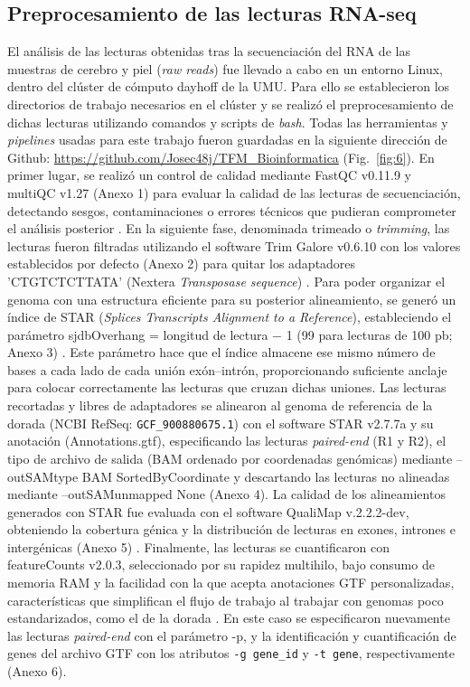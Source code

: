 \documentclass[10pt,a4paper]{article}
\begin{document}
\subsection{Preprocesamiento de las lecturas RNA-seq}  
El análisis de las lecturas obtenidas tras la secuenciación del RNA de las muestras de cerebro y piel (\textit{raw reads}) fue llevado a cabo en un entorno Linux, dentro del clúster de cómputo dayhoff de la UMU. Para ello se establecieron los directorios de trabajo necesarios en el clúster y se realizó el preprocesamiento de dichas lecturas utilizando comandos y scripts de \textit{bash}. Todas las herramientas y  \textit{pipelines} usadas para este trabajo fueron guardadas en la siguiente dirección de Github: \url{https://github.com/Josec48j/TFM_Bioinformatica} (Fig.~\ref{fig:6}). En primer lugar, se realizó un control de calidad mediante FastQC v0.11.9 y multiQC v1.27 (Anexo 1) para evaluar la calidad de las lecturas de secuenciación, detectando sesgos, contaminaciones o errores técnicos que pudieran comprometer el análisis posterior \parencite{Andrews2010}. En la siguiente fase, denominada trimeado o \textit{trimming}, las lecturas fueron filtradas utilizando el software Trim Galore v0.6.10 con los valores establecidos por defecto (Anexo 2) para quitar los adaptadores 'CTGTCTCTTATA' (Nextera \textit{Transposase sequence}) \parencite{Krueger2015}. Para poder organizar el genoma con una estructura eficiente para su posterior alineamiento, se generó un índice de STAR (\textit{Splices Transcripts Alignment to a Reference}), estableciendo el parámetro sjdbOverhang = longitud de lectura − 1 (99 para lecturas de 100 pb; Anexo 3) \parencite{Dobin2013}. Este parámetro hace que el índice almacene ese mismo número de bases a cada lado de cada unión exón–intrón, proporcionando suficiente anclaje para colocar correctamente las lecturas que cruzan dichas uniones. Las lecturas recortadas y libres de adaptadores se alinearon al genoma de referencia de la dorada (NCBI RefSeq: \texttt{GCF\_900880675.1}) con el software STAR v2.7.7a y su anotación (Annotations.gtf), especificando las lecturas \textit{paired-end} (R1 y R2), el tipo de archivo de salida (BAM ordenado por coordenadas genómicas) mediante --outSAMtype BAM SortedByCoordinate y descartando las lecturas no alineadas mediante --outSAMunmapped None (Anexo 4). La calidad de los alineamientos generados con STAR fue evaluada con el software QualiMap v.2.2.2-dev, obteniendo la cobertura génica y la distribución de lecturas en exones, intrones e intergénicas (Anexo 5)  \parencite{GarciaAlcalde2012}. Finalmente, las lecturas se cuantificaron con featureCounts v2.0.3, seleccionado por su rapidez multihilo, bajo consumo de memoria RAM y la facilidad con la que acepta anotaciones GTF personalizadas, características que simplifican el flujo de trabajo al trabajar con genomas poco estandarizados, como el de la dorada \parencite{Liao2014}. En este caso se especificaron nuevamente las lecturas \textit{paired-end} con el parámetro -p, y la identificación y cuantificación de genes del archivo GTF con los atributos \texttt{-g gene\_id} y \texttt{-t gene}, respectivamente (Anexo 6).
\end{document}
